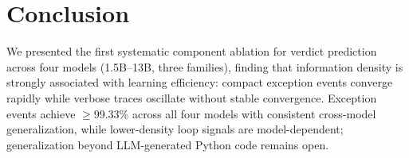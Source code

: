\section{Conclusion}

We presented the first systematic component ablation for verdict prediction across four models (1.5B--13B, three families), finding that information density is strongly associated with learning efficiency: compact exception events converge rapidly while verbose traces oscillate without stable convergence.
Exception events achieve ${\geq}$99.33\% across all four models with consistent cross-model generalization, while lower-density loop signals are model-dependent; generalization beyond LLM-generated Python code remains open.
